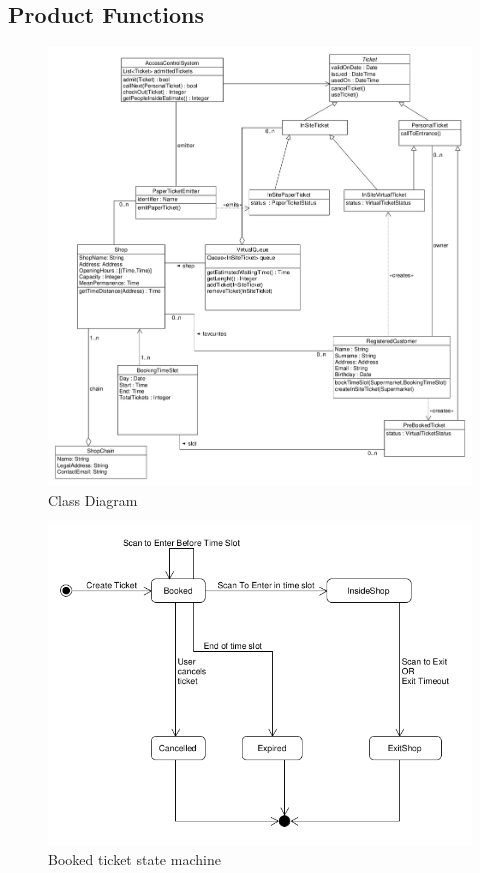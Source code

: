 \subsection{Product Functions}
\begin{figure}
    \centering
    \includegraphics[width=\textwidth]{Images/UML_class_synthetic.png}
    \caption{\label{fig:Booked_Ticket_State}Class Diagram}
\end{figure}
\begin{figure}
    \centering
    \includegraphics[width=\textwidth]{Images/UML_booked_ticket.png}
    \caption{\label{fig:Booked_Ticket_State}Booked ticket state machine}
\end{figure}
